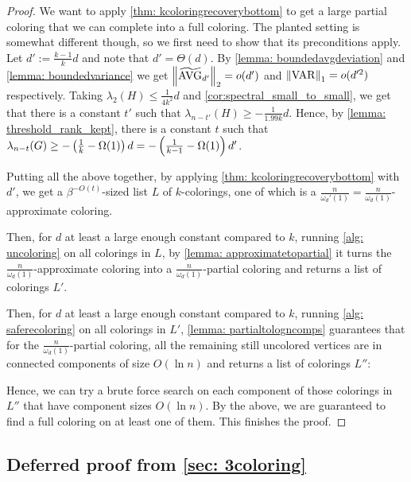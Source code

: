 \begin{proof}
    We want to apply \cref{thm: kcoloringrecoverybottom} to get a large partial coloring that we can complete into a full coloring.
    The planted setting is somewhat different though, so we first need to show that its preconditions apply. Let $d':=\frac{k-1}{k}d$ and note that $d'=\Theta(d)$. By \cref{lemma: boundedavgdeviation} and \cref{lemma: boundedvariance} we get $\Norm{\nAVG_{d'}}_2=o(d')$ and $\Norm{\VAR}_1=o(d'^2)$ respectively. Taking $\lambda_2(H)\leq \frac{1}{4k^2}d$ and \cref{cor:spectral_small_to_small}, we get that there is a constant $t'$ such that $\lambda_{n-t'}(H)\geq -\frac{1}{1.99k}d$.
    Hence, by \cref{lemma: threshold_rank_kept}, there is a constant $t$ such that $\lambda_{n-t}(G)\geq -\left(\frac{1}{k}-\Omega(1)\right)d= -\left(\frac{1}{k-1}-\Omega(1)\right)d'$.

    Putting all the above together, by applying \cref{thm: kcoloringrecoverybottom} with $d'$, we get a $\beta^{-O(t)}$-sized list $L$ of $k$-colorings, one of which is a $\frac{n}{\omega_d'(1)}=\frac{n}{\omega_d(1)}$-approximate coloring.

    Then, for $d$ at least a large enough constant compared to $k$, running \cref{alg: uncoloring} on all colorings in $L$, by \cref{lemma: approximatetopartial} it turns the $\frac{n}{\omega_d(1)}$-approximate coloring into a $\frac{n}{\omega_d(1)}$-partial coloring and returns a list of colorings $L'$.   

    Then, for $d$ at least a large enough constant compared to $k$, running \cref{alg: saferecoloring} on all colorings in $L'$, \cref{lemma: partialtologncomps} guarantees that for the $\frac{n}{\omega_d(1)}$-partial coloring, all the remaining still uncolored vertices are in connected components of size $O(\ln{n})$ and returns a list of colorings $L''$:

    Hence, we can try a brute force search on each component of those colorings in $L''$ that have component sizes $O(\ln{n})$. By the above, we are guaranteed to find a full coloring on at least one of them. This finishes the proof.
\end{proof}

\subsection{Deferred proof from \cref{sec: 3coloring}}\label{app: 3coloring}

